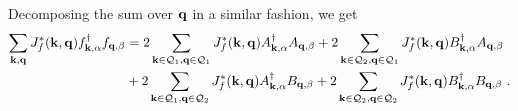 \documentclass[%
reprint,
superscriptaddress,
groupedaddress,
superscriptaddress,
onecolumn,
]{revtex4-2}
\begin{document}
Decomposing the sum over \({\bf q}\) in a similar fashion, we get
\begin{equation}\begin{aligned}
	\sum_{{\bf k}, {\bf q}} J_f^*({\bf k},{\bf q}) f^\dagger_{{\bf k},\alpha}f_{{\bf q},\beta} 
	&= 2\sum_{{\bf k} \in \mathcal{Q}_1, {\bf q} \in \mathcal{Q}_1} J_f^*({\bf k},{\bf q}) A^\dagger_{{\bf k},\alpha}A_{{\bf q},\beta} + 2\sum_{{\bf k} \in \mathcal{Q}_2, {\bf q} \in \mathcal{Q}_1} J_f^*({\bf k},{\bf q}) B^\dagger_{{\bf k},\alpha}A_{{\bf q},\beta} \\
	&+ 2\sum_{{\bf k} \in \mathcal{Q}_1, {\bf q} \in \mathcal{Q}_2} J_f^*({\bf k},{\bf q}) A^\dagger_{{\bf k},\alpha}B_{{\bf q},\beta} + 2\sum_{{\bf k} \in \mathcal{Q}_2, {\bf q} \in \mathcal{Q}_2} J_f^*({\bf k},{\bf q}) B^\dagger_{{\bf k},\alpha}B_{{\bf q},\beta}~.
\end{aligned}\end{equation}
\end{document}
